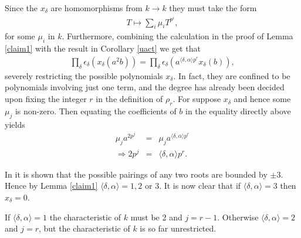 Since the $x_\delta$ are homomorphisms from $k\rightarrow k$ they must take the form
\begin{eqnarray*}
T\mapsto\sum_i \mu_i T^{p^i},
\end{eqnarray*}
for some $\mu_i$ in $k$. Furthermore, combining the calculation in the proof of Lemma \ref{claim1} with the result in Corollary \ref{uact} we get that
\begin{eqnarray*}
\prod_\delta \epsilon_\delta\left(x_\delta\left(a^2b\right)\right) = \prod_\delta \epsilon_\delta\left(a^{\langle \delta, \alpha \rangle p^r}x_\delta\left(b\right)\right),
\end{eqnarray*}
severely restricting the possible polynomials $x_\delta$. In fact, they are confined to be polynomials involving just one term, and the degree has already been decided upon fixing the integer $r$ in the definition of $\rho_r$. For suppose $x_\delta$ and hence some $\mu_j$ is non-zero. Then equating the coefficients of $b$ in the equality directly above yields
\begin{eqnarray*}
\mu_ja^{2p^j} &=& \mu_j a^{\langle \delta, \alpha \rangle p^r}\\
\Longrightarrow2p^j &=& \langle \delta, \alpha \rangle p^r.
\end{eqnarray*}

In \cite{carter1989simple} it is shown that the possible pairings of any two roots are bounded by $\pm 3$. Hence by Lemma \ref{claim1} $\langle \delta, \alpha \rangle = 1, 2$ or 3. It is now clear that if $\langle \delta, \alpha \rangle = 3$ then $x_\delta = 0$.

If $\langle \delta, \alpha \rangle = 1$ the characteristic of $k$ must be 2 and $j = r-1$. Otherwise $\langle \delta, \alpha \rangle = 2$ and $j = r$, but the characteristic of $k$ is so far unrestricted.

